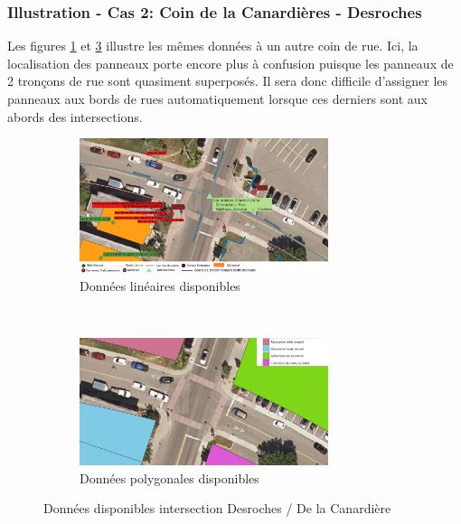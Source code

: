    \subsubsection{Illustration - Cas 2: Coin de la Canardières - Desroches}
    Les figures \ref{fig:donnes_panneaux_Desroches} et \ref{fig:donnes_polygone_panneaux_Desroches} illustre les mêmes données à un autre coin de rue. Ici, la localisation des panneaux porte encore plus à confusion puisque les panneaux de 2 tronçons de rue sont quasiment superposés. Il sera donc difficile d'assigner les panneaux aux bords de rues automatiquement lorsque ces derniers sont aux abords des intersections.
      \begin{figure}[ht]
        \centering
        \begin{subfigure}{\linewidth}
          \centering
          \includegraphics[width=0.8\textwidth]{images/donnees_disponible_Desroches_legende_v2.png}
        \caption{Données linéaires disponibles}
        \label{fig:donnes_panneaux_Desroches}
        \end{subfigure} \\
        \begin{subfigure}{\linewidth}
          \centering
          \includegraphics[width=0.8\textwidth]{images/utilisation_sols_Desroches_v2.png}
        \caption{Données polygonales disponibles}
        \label{fig:donnes_polygone_panneaux_Desroches}
        \end{subfigure}
        \caption{Données disponibles intersection Desroches / De la Canardière}
      \end{figure}
    
